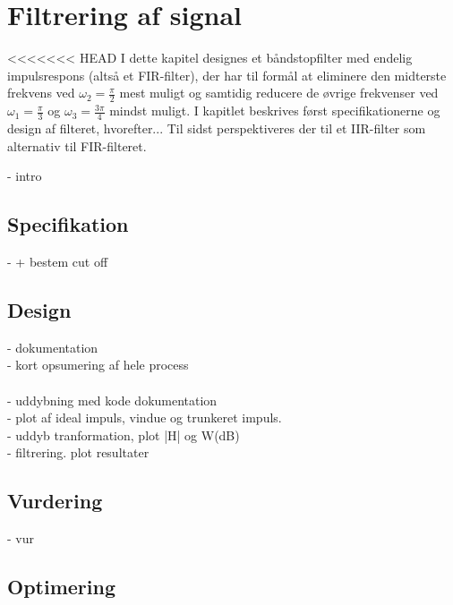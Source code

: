 \chapter{Filtrering af signal}
<<<<<<< HEAD
I dette kapitel designes et båndstopfilter med endelig impulsrespons (altså et FIR-filter), der har til formål at eliminere den midterste frekvens ved $\omega_2 = \frac{\pi}{2}$ mest muligt og samtidig reducere de øvrige frekvenser ved $\omega_1 = \frac{\pi}{3}$ og $\omega_3 = \frac{3\pi}{4}$ mindst muligt. I kapitlet beskrives først specifikationerne og design af filteret, hvorefter... Til sidst perspektiveres der til et IIR-filter som alternativ til FIR-filteret.


- intro 
\section{Specifikation}
-  + bestem cut off

\section{Design}
- dokumentation\\
- kort opsumering af hele process\\ 
\\
- uddybning med kode dokumentation\\
- plot af ideal impuls, vindue og trunkeret impuls.\\ 
- uddyb tranformation, plot |H| og W(dB)\\
- filtrering. plot resultater \\



\section{Vurdering}
- vur   

\section{Optimering}
